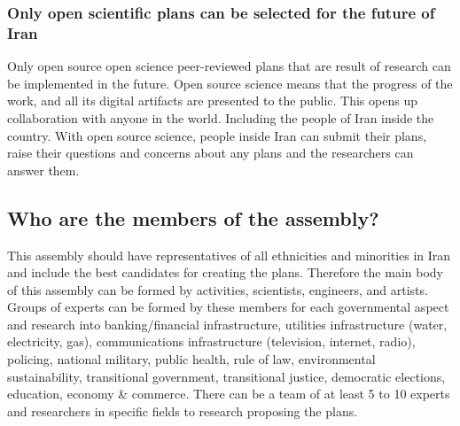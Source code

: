 \documentclass{IEEEtran}
\begin{document}
\subsubsection{Only open scientific plans can be selected for the future of Iran}
Only open source open science peer-reviewed plans that are result of research can be implemented in the future. 
Open source science means that the progress of the work, and all its digital artifacts are presented to the public.
This opens up collaboration with anyone in the world. Including the people of Iran inside the country.
With open source science, people inside Iran can submit their plans, raise their questions and concerns about any plans and the researchers can answer them.



\subsection{Who are the members of the assembly?}
This assembly should have representatives of all ethnicities and minorities in Iran and include the best candidates for creating the plans.
 Therefore the main body of this assembly can be formed by activities, scientists, engineers, and artists.
  Groups of experts can be formed by these members for each governmental aspect and research into 
  banking/financial infrastructure, utilities infrastructure (water, electricity, gas), communications infrastructure (television, internet, radio), policing, 
  national military, public health, rule of law, environmental sustainability, transitional government,
   transitional justice, democratic elections, education, economy \& commerce.
There can be a team of at least 5 to 10 experts and researchers in specific fields to research proposing the plans.
\end{document}
